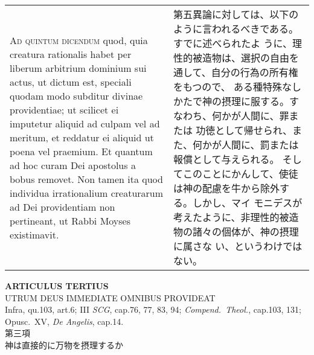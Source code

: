 \documentclass[10pt]{jsarticle} %
\begin{document}
\begin{longtable}{p{21em}p{21em}}
\\



{\scshape Ad quintum dicendum} quod, quia creatura
rationalis habet per liberum arbitrium dominium sui actus, ut dictum
est, speciali quodam modo subditur divinae providentiae; ut scilicet ei
imputetur aliquid ad culpam vel ad meritum, et reddatur ei aliquid ut
poena vel praemium. Et quantum ad hoc curam Dei apostolus a bobus
removet. Non tamen ita quod individua irrationalium creaturarum ad Dei
providentiam non pertineant, ut Rabbi Moyses existimavit.

&

第五異論に対しては、以下のように言われるべきである。すでに述べられたよ
うに、理性的被造物は、選択の自由を通して、自分の行為の所有権をもつので、
ある種特殊なしかたで神の摂理に服する。すなわち、何かが人間に、罪または
功徳として帰せられ、また、何かが人間に、罰または報償として与えられる。
そしてこのことにかんして、使徒は神の配慮を牛から除外する。しかし、マイ
モニデスが考えたように、非理性的被造物の諸々の個体が、神の摂理に属さな
い、というわけではない。



\end{longtable}
\newpage



\begin{center}
 {\Large {\bf ARTICULUS TERTIUS}}\\
 {\large UTRUM DEUS IMMEDIATE OMNIBUS PROVIDEAT}\\
 {\footnotesize Infra, qu.103, art.6; III {\itshape SCG}, cap.76, 77,
 83, 94; {\itshape Compend.~Theol.}, cap.103, 131; Opusc.~XV, {\itshape
 De Angelis}, cap.14.}\\
 {\Large 第三項\\神は直接的に万物を摂理するか}
\end{center}
\end{document}
